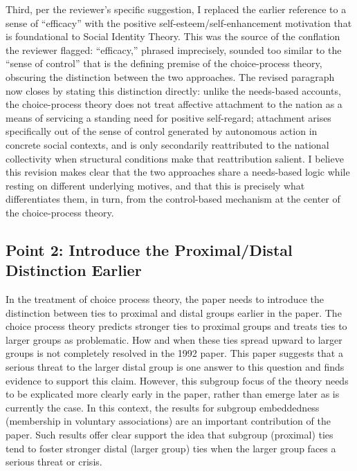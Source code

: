 \documentclass[11pt]{article}
\begin{document}
Third, per the reviewer's specific suggestion, I replaced the earlier reference to a sense of ``efficacy'' with the positive self-esteem/self-enhancement motivation that is foundational to Social Identity Theory. This was the source of the conflation the reviewer flagged: ``efficacy,'' phrased imprecisely, sounded too similar to the ``sense of control'' that is the defining premise of the choice-process theory, obscuring the distinction between the two approaches. The revised paragraph now closes by stating this distinction directly: unlike the needs-based accounts, the choice-process theory does not treat affective attachment to the nation as a means of servicing a standing need for positive self-regard; attachment arises specifically out of the sense of control generated by autonomous action in concrete social contexts, and is only secondarily reattributed to the national collectivity when structural conditions make that reattribution salient. I believe this revision makes clear that the two approaches share a needs-based logic while resting on different underlying motives, and that this is precisely what differentiates them, in turn, from the control-based mechanism at the center of the choice-process theory.

\subsection*{Point 2: Introduce the Proximal/Distal Distinction Earlier}

\begin{reviewercomment}
In the treatment of choice process theory, the paper needs to introduce the distinction between ties to proximal and distal groups earlier in the paper. The choice process theory predicts stronger ties to proximal groups and treats ties to larger groups as problematic. How and when these ties spread upward to larger groups is not completely resolved in the 1992 paper. This paper suggests that a serious threat to the larger distal group is one answer to this question and finds evidence to support this claim. However, this subgroup focus of the theory needs to be explicated more clearly early in the paper, rather than emerge later as is currently the case. In this context, the results for subgroup embeddedness (membership in voluntary associations) are an important contribution of the paper. Such results offer clear support the idea that subgroup (proximal) ties tend to foster stronger distal (larger group) ties when the larger group faces a serious threat or crisis.
\end{reviewercomment}
\end{document}
